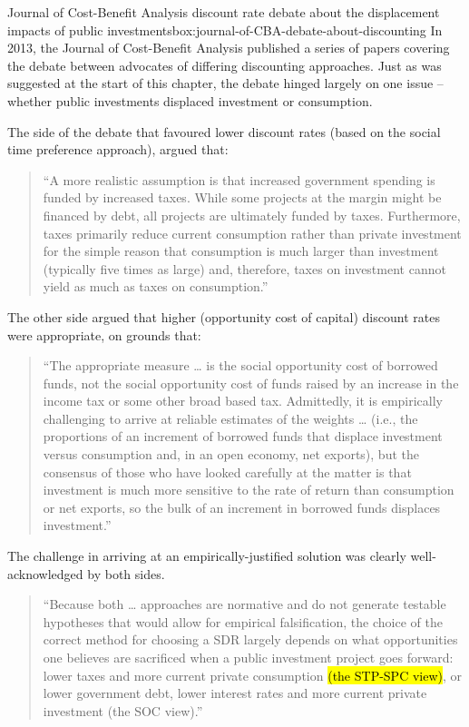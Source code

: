 \begin{bigbox}{Journal of Cost-Benefit Analysis discount rate debate about the displacement impacts of public investments}{box:journal-of-CBA-debate-about-discounting}
In 2013, the Journal of Cost-Benefit Analysis published a series of papers covering the debate between advocates of differing discounting approaches. Just as was suggested at the start of this chapter, the debate hinged largely on one issue – whether public investments displaced investment or consumption. 

The side of the debate that favoured lower discount rates (based on the social time preference approach), argued that:

\begin{quote}
\textquotedblleft A more realistic assumption is that increased government spending is funded by increased taxes. While some projects at the margin might be financed by debt, all projects are ultimately funded by taxes. Furthermore, taxes primarily reduce current consumption rather than private investment for the simple reason that consumption is much larger than investment (typically five times as large) and, therefore, taxes on investment cannot yield as much as taxes on consumption.”
\end{quote}
The other side argued that higher (opportunity cost of capital) discount rates were appropriate, on grounds that: 

\begin{quote}
\textquotedblleft The appropriate measure … is the social opportunity cost of borrowed funds, not the social opportunity cost of funds raised by an increase in the income tax or some other broad based tax. Admittedly, it is empirically challenging to arrive at reliable estimates of the weights … (i.e., the proportions of an increment of borrowed funds that displace investment versus consumption and, in an open economy, net exports), but the consensus of those who have looked carefully at the matter is that investment is much more sensitive to the rate of return than consumption or net exports, so the bulk of an increment in borrowed funds displaces investment.”
\end{quote}
The challenge in arriving at an empirically-justified solution was clearly well-acknowledged by both sides.

\begin{quote}
\textquotedblleft Because both … approaches are normative and do not generate testable hypotheses that would allow for empirical falsification, the choice of the correct method for choosing a SDR largely depends on what opportunities one believes are sacrificed when a public investment project goes forward: lower taxes and more current private consumption \hl{(the STP-SPC view)}, or lower government debt, lower interest rates and more current private investment (the SOC view).” 
\end{quote}


\end{bigbox}
